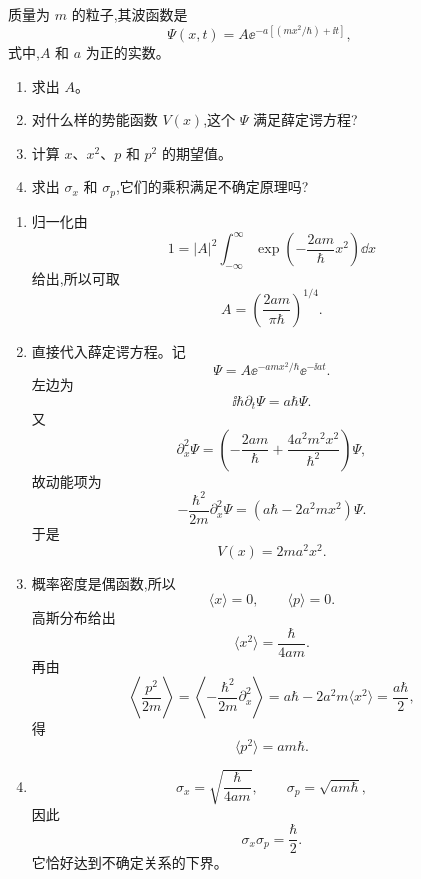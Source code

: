 \begin{question}
质量为 $m$ 的粒子,其波函数是
\[
\Psi(x,t)=A \ee^{-a[(mx^2/\hbar)+\ii t]},
\]
式中,$A$ 和 $a$ 为正的实数。
\begin{enumerate}
\item 求出 $A$。
\item 对什么样的势能函数 $V(x)$,这个 $\Psi$ 满足薛定谔方程?
\item 计算 $x$、$x^2$、$p$ 和 $p^2$ 的期望值。
\item 求出 $\sigma_x$ 和 $\sigma_p$,它们的乘积满足不确定原理吗?
\end{enumerate}
\begin{solution}
\begin{enumerate}
\item 归一化由
\[
1=|A|^2\int_{-\infty}^{\infty}\exp\left(-\frac{2am}{\hbar}x^2\right)\dd x
\]
给出,所以可取
\[
A=\left(\frac{2am}{\pi\hbar}\right)^{1/4}.
\]
\item 直接代入薛定谔方程。记
\[
\Psi=A\ee^{-amx^2/\hbar}\ee^{-\ii at}.
\]
左边为
\[
\ii\hbar\partial_t\Psi=a\hbar\Psi.
\]
又
\[
\partial_x^2\Psi=\left(-\frac{2am}{\hbar}+\frac{4a^2m^2x^2}{\hbar^2}\right)\Psi,
\]
故动能项为
\[
-\frac{\hbar^2}{2m}\partial_x^2\Psi=(a\hbar-2a^2mx^2)\Psi.
\]
于是
\[
V(x)=2ma^2x^2.
\]
\item 概率密度是偶函数,所以
\[
\langle x\rangle=0,\qquad \langle p\rangle=0.
\]
高斯分布给出
\[
\langle x^2\rangle=\frac{\hbar}{4am}.
\]
再由
\[
\left\langle \frac{p^2}{2m}\right\rangle
=\left\langle -\frac{\hbar^2}{2m}\partial_x^2\right\rangle
=a\hbar-2a^2m\langle x^2\rangle=\frac{a\hbar}{2},
\]
得
\[
\langle p^2\rangle=am\hbar.
\]
\item
\[
\sigma_x=\sqrt{\frac{\hbar}{4am}},\qquad
\sigma_p=\sqrt{am\hbar},
\]
因此
\[
\sigma_x\sigma_p=\frac{\hbar}{2}.
\]
它恰好达到不确定关系的下界。
\end{enumerate}
\end{solution}
\end{question}

